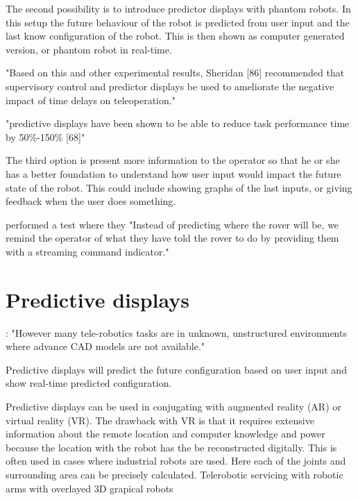 The second possibility is to introduce predictor displays with phantom robots. In this setup the future behaviour of the robot is predicted from user input and the last know configuration of the robot. This is then shown as computer generated version, or phantom robot in real-time.

\citep{Chen2007} "Based on this and other experimental results, Sheridan [86] recommended that supervisory control and predictor displays be used to ameliorate the negative impact of time delays on teleoperation."

"predictive displays have been shown to be able to reduce task performance time by 50\%-150\% [68]"

The third option is present more information to the operator so that he or she has a better foundation to understand how user input would impact the future state of the robot. This could include showing graphs of the last inputs, or giving feedback when the user does something.

\citep{Miller2005} performed a test where they "Instead of predicting where the rover will be, we remind the operator of what they have told the rover to do by providing them with a streaming command indicator."


\section{Predictive displays}


\citep{Hu2015}: "However many tele-robotics tasks are in unknown, unstructured environments where advance CAD models are not available."

Predictive displays will predict the future configuration based on user input and show real-time predicted configuration.

Predictive displays can be used in conjugating with augmented reality (AR) or virtual reality (VR). The drawback with VR is that it requires extensive information about the remote location and computer knowledge and power because the location with the robot has the be reconstructed digitally. This is often used in cases where industrial robots are used. Here each of the joints and surrounding area can be precisely calculated. Telerobotic servicing with robotic arms with overlayed 3D grapical robots \citep{Kim1993}

